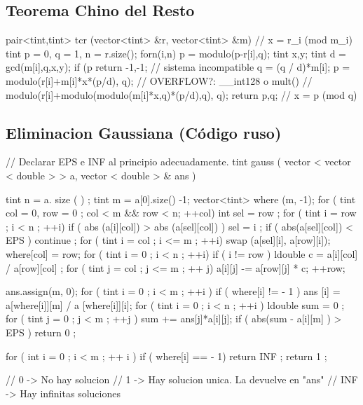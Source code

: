 \subsection{Teorema Chino del Resto}

\begin{code}

pair<tint,tint> tcr (vector<tint> &r, vector<tint> &m) // x = r_i (mod m_i)
{
	tint p = 0, q = 1, n = r.size();
	forn(i,n)
	{
		p = modulo(p-r[i],q);
		tint x,y;
		tint d = gcd(m[i],q,x,y);
		if (p %
		return {-1,-1}; // sistema incompatible
		q = (q / d)*m[i];
		p = modulo(r[i]+m[i]*x*(p/d), q); //  OVERFLOW?: __int128 o mult()
		// modulo(r[i]+modulo(modulo(m[i]*x,q)*(p/d),q), q); 
	}
	return {p,q}; // x = p (mod q)
}


\end{code}


\subsection{Eliminacion Gaussiana (Código ruso)}
\begin{code}
// Declarar EPS e INF al principio adecuadamente.
tint gauss ( vector < vector < double > > a, vector < double > & ans ) {
	tint n = a. size ( ) ;
	tint m = a[0].size() -1;
	vector<tint> where (m, -1);
	for ( tint col = 0, row = 0 ; col < m && row < n; ++col)
	{
		int sel = row ;
		for ( tint i = row ; i < n ; ++i)
			if ( abs (a[i][col]) > abs (a[sel][col]) )
				sel = i ;
		if ( abs(a[sel][col]) < EPS )
			continue ;
		for ( tint i = col ; i <= m ; ++i)
			swap (a[sel][i], a[row][i]);
		where[col] = row;
		for ( tint i = 0 ; i < n ; ++i)
			if ( i != row ) 
			{
				ldouble c = a[i][col] / a[row][col] ;
				for ( tint j = col ; j <= m ; ++ j)
					a[i][j] -= a[row][j] * c;
			}
		++row;
	}
 
	ans.assign(m, 0);
	for ( tint i = 0 ; i < m ; ++i )
		if ( where[i] != - 1 )
			ans [i] = a[where[i]][m] / a [where[i]][i];
	for ( tint i = 0 ; i < n ; ++i ) 
	{
		ldouble sum = 0 ;
		for ( tint j = 0 ; j < m ; ++j )
			sum += ans[j]*a[i][j];
		if ( abs(sum - a[i][m] ) > EPS )
			return 0 ;
	}
 
	for ( int i = 0 ; i < m ; ++ i )
		if ( where[i] == - 1)
			return INF ;
	return 1 ;
}

// 0 -> No hay solucion
// 1 -> Hay solucion unica. La devuelve en "ans"
// INF -> Hay infinitas soluciones

\end{code}

